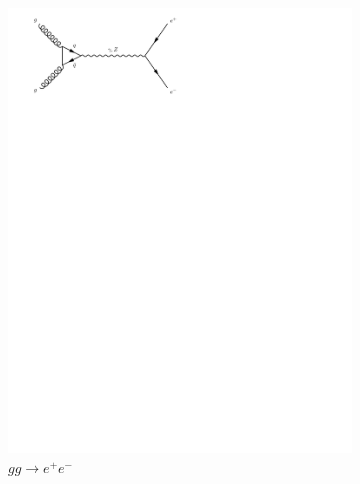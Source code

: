 \begin{figure}[h]
\begin{subfigure}[b]{0.3\textwidth}
    \includegraphics[trim={0.5cm 22cm 10cm 0cm},width=\textwidth]{../Diagrams/D2.pdf}
    \caption{$gg\rightarrow e^+e^-$}
    \label{fey:2}
  \end{subfigure}%
  ~
  \begin{subfigure}[b]{0.3\textwidth}

\end{subfigure}
\end{figure}
